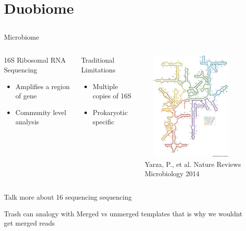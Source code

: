 \documentclass[11pt, xcolor=table]{beamer}
\begin{document}
\section{Duobiome}
\subsection{}

	
	\begin{frame}{Microbiome}
	\begin{columns}
	\begin{block}{16S Ribosomal RNA Sequencing}
	\begin{itemize}
		\item Amplifies a region of gene
		\item Community level analysis 
	\end{itemize}
	\end{block}
		
		
	\begin{block}{Traditional Limitations}
	\begin{itemize}
		\item Multiple copies of 16S
		\item \alert{Prokaryotic specific}
	\end{itemize}
	\end{block}
	
	\includegraphics[height=5.5cm, width=5cm]{ribosome.jpg} \\
	\tiny{Yarza, P., et al. Nature Reviews Microbiology 2014}
	\end{columns}
	Talk more about 16 sequencing sequencing
	
	Trash can analogy with 
	Merged vs unmerged templates that is why we wouldnt get merged reads
	
	
	\end{frame}
\end{document}
